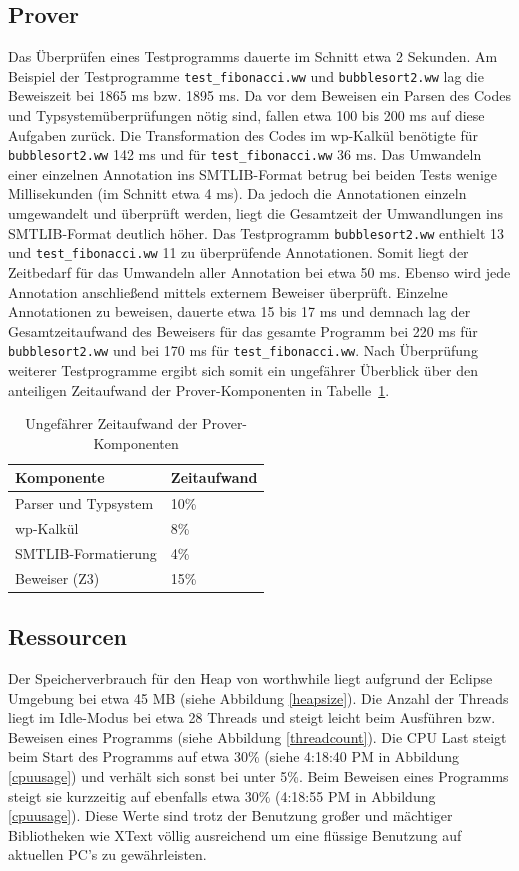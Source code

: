 \subsection{Prover}
Das Überprüfen eines Testprogramms dauerte im Schnitt etwa 2 Sekunden. Am Beispiel der Testprogramme \texttt{test\_fibonacci.ww} und \texttt{bubblesort2.ww} lag die Beweiszeit bei 1865 ms bzw. 1895 ms. Da vor dem Beweisen ein Parsen des Codes und Typsystemüberprüfungen nötig sind, fallen etwa 100 bis 200 ms auf diese Aufgaben zurück. Die Transformation des Codes im wp-Kalkül benötigte für \texttt{bubblesort2.ww} 142 ms und für \texttt{test\_fibonacci.ww} 36 ms. Das Umwandeln einer einzelnen Annotation ins SMTLIB-Format betrug bei beiden Tests wenige Millisekunden (im Schnitt etwa 4 ms). Da jedoch die Annotationen einzeln umgewandelt und überprüft werden, liegt die Gesamtzeit der Umwandlungen ins SMTLIB-Format deutlich höher. Das Testprogramm \texttt{bubblesort2.ww} enthielt 13 und \texttt{test\_fibonacci.ww} 11 zu überprüfende Annotationen. Somit liegt der Zeitbedarf für das Umwandeln aller Annotation bei etwa 50 ms. Ebenso wird jede Annotation anschließend mittels externem Beweiser überprüft. Einzelne Annotationen zu beweisen, dauerte etwa 15 bis 17 ms und demnach lag der Gesamtzeitaufwand des Beweisers für das gesamte Programm bei 220 ms für \texttt{bubblesort2.ww} und bei 170 ms für \texttt{test\_fibonacci.ww}. Nach Überprüfung weiterer Testprogramme ergibt sich somit ein ungefährer Überblick über den anteiligen Zeitaufwand der Prover-Komponenten in Tabelle~\ref{zeitaufwandprover}.

\begin{table}
\centering
\caption{Ungefährer Zeitaufwand der Prover-Komponenten}
\label{zeitaufwandprover}
\begin{tabular}{|l|l|}
\hline
\textbf{Komponente} & \textbf{Zeitaufwand} \\
\hline
Parser und Typsystem & 10\% \\
\hline
wp-Kalkül & 8\% \\
\hline
SMTLIB-Formatierung & 4\% \\
\hline
Beweiser (Z3) & 15\% \\
\hline
\end{tabular}
\end{table}

\subsection{Ressourcen}
Der Speicherverbrauch für den Heap von worthwhile liegt aufgrund der Eclipse Umgebung bei etwa 45 MB (siehe Abbildung \ref{heapsize}). Die Anzahl der Threads liegt im Idle-Modus bei etwa 28 Threads und steigt leicht beim Ausführen bzw. Beweisen eines Programms (siehe Abbildung \ref{threadcount}). Die CPU Last steigt beim Start des Programms auf etwa 30\% (siehe 4:18:40 PM in Abbildung \ref{cpuusage}) und verhält sich sonst bei unter 5\%. Beim Beweisen eines Programms steigt sie kurzzeitig auf ebenfalls etwa 30\% (4:18:55 PM in Abbildung \ref{cpuusage}). Diese Werte sind trotz der Benutzung großer und mächtiger Bibliotheken wie XText völlig ausreichend um eine flüssige Benutzung auf aktuellen PC's zu gewährleisten.

